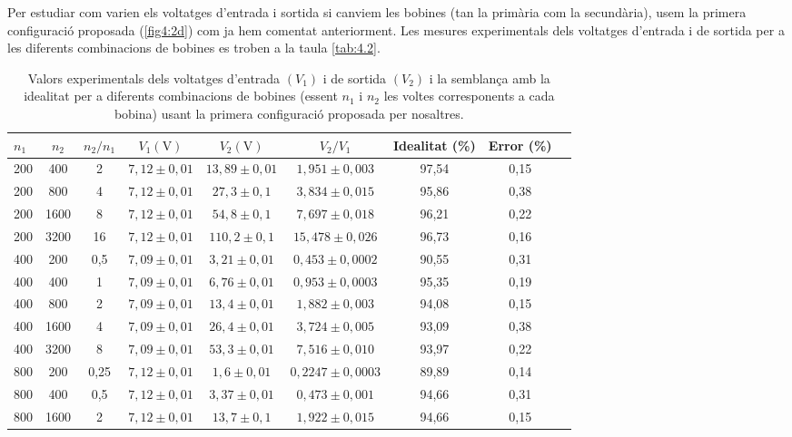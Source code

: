 \documentclass[a4paper,10.5pt]{report}
\begin{document}
Per estudiar com varien els voltatges d'entrada i sortida si canviem les bobines (tan la primària com la secundària), usem la primera configuració proposada (\ref{fig4:2d}) com ja hem comentat anteriorment. Les mesures experimentals dels voltatges d'entrada i de sortida per a les diferents combinacions de bobines es troben a la taula \ref{tab:4.2}. 
\begin{table}[H]
	\centering
	\renewcommand{\arraystretch}{1.2}
	\caption{Valors experimentals dels voltatges d'entrada $(V_1)$ i de sortida $(V_2)$ i la semblança amb la idealitat per a diferents combinacions de bobines (essent $n_1$ i $n_2$ les voltes corresponents a cada bobina) usant la primera configuració proposada per nosaltres.}
	\begin{tabular}{lcccccccc}
		\toprule
		$n_1$ & $n_2$ & $n_2/n_1$ & $V_1 (\text{V})$ & $V_2 (\text{V})$ & $V_2/V_1$ & Idealitat (\%) & Error (\%) \\
		\midrule
		200 & 400 & 2 & $7{,}12 \pm 0{,}01$ & $13{,}89 \pm 0{,}01$ & $1{,}951 \pm 0{,}003$ & 97,54 & 0,15 \\
		200 & 800 & 4 & $7{,}12 \pm 0{,}01$ & $27{,}3 \pm 0{,}1$ & $3{,}834 \pm 0{,}015$ & 95,86 & 0,38 \\
		200 & 1600 & 8 & $7{,}12 \pm 0{,}01$ & $54{,}8 \pm 0{,}1$ & $7{,}697 \pm 0{,}018$ & 96,21 & 0,22 \\
		200 & 3200 & 16 & $7{,}12 \pm 0{,}01$ & $110{,}2 \pm 0{,}1$ & $15{,}478 \pm 0{,}026$ & 96,73 & 0,16 \\
		\midrule
		400 & 200 & 0{,}5 & $7{,}09 \pm 0{,}01$ & $3{,}21 \pm 0{,}01$ & $0{,}453 \pm 0{,}0002$ & 90,55 & 0,31 \\
		400 & 400 & 1 & $7{,}09 \pm 0{,}01$ & $6{,}76 \pm 0{,}01$ & $0{,}953 \pm 0{,}0003$ & 95,35 & 0,19 \\
		400 & 800 & 2 & $7{,}09 \pm 0{,}01$ & $13{,}4 \pm 0{,}01$ & $1{,}882 \pm 0{,}003$ & 94,08 & 0,15 \\
		400 & 1600 & 4 & $7{,}09 \pm 0{,}01$ & $26{,}4 \pm 0{,}01$ & $3{,}724 \pm 0{,}005$ & 93,09 & 0,38 \\
		400 & 3200 & 8 & $7{,}09 \pm 0{,}01$ & $53{,}3 \pm 0{,}01$ & $7{,}516 \pm 0{,}010$ & 93,97 & 0,22 \\
		\midrule
		800 & 200 & 0{,}25 & $7{,}12 \pm 0{,}01$ & $1{,}6 \pm 0{,}01$ & $0{,}2247 \pm 0{,}0003$ & 89,89 & 0,14 \\
		800 & 400 & 0{,}5 & $7{,}12 \pm 0{,}01$ & $3{,}37 \pm 0{,}01$ & $0{,}473 \pm 0{,}001$ & 94,66 & 0,31 \\
		800 & 1600 & 2 & $7{,}12 \pm 0{,}01$ & $13{,}7 \pm 0{,}1$ & $1{,}922 \pm 0{,}015$ & 94,66 & 0,15 \\

\end{tabular}
\end{table}
\end{document}
